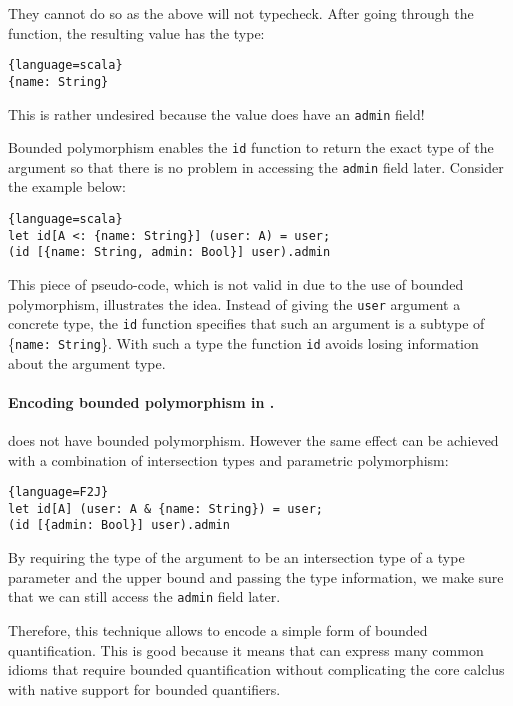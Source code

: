 They cannot do so as the above will not typecheck. After going through the
function, the resulting value has the type:

\begin{lstlisting}{language=scala}
{name: String}
\end{lstlisting}
This is rather undesired because the value does have an \texttt{admin} field!

Bounded polymorphism enables the \lstinline{id} function to return the exact type of the
argument so that there is no problem in accessing the \texttt{admin} field later.
Consider the example below:
\begin{lstlisting}{language=scala}
let id[A <: {name: String}] (user: A) = user;
(id [{name: String, admin: Bool}] user).admin
\end{lstlisting}

\noindent This piece of pseudo-code, which is not valid in \name due
to the use of bounded polymorphism, illustrates the idea. Instead of
giving the \lstinline{user} argument a concrete type, the
\lstinline{id} function specifies that such an argument is a subtype
of \{\lstinline{name: String}\}. With such a type the function
\lstinline{id} avoids losing information about the argument type.


\paragraph{Encoding bounded polymorphism in \name.}
\name does not have bounded polymorphism. However the same effect can
be achieved with a combination of intersection types and parametric polymorphism:
\begin{lstlisting}{language=F2J}
let id[A] (user: A & {name: String}) = user;
(id [{admin: Bool}] user).admin
\end{lstlisting}
By requiring the type of the argument to be an intersection type of a type
parameter and the upper bound and passing the type information, we make sure
that we can still access the \lstinline{admin} field later. 

Therefore, this technique allows \name to encode a simple form
of bounded quantification. This is good because it means that \name
can express many common idioms that require bounded quantification
without complicating the core calclus with native support for bounded quantifiers.






